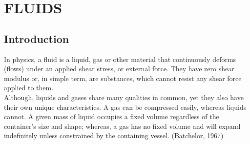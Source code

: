 \documentclass[11pt]{report}
\begin{document}
	\chapter{FLUIDS}
	\section{Introduction}
	In physics, a fluid is a liquid, gas or other material that continuously deforms (flows) under an applied shear stress, or external force. They have zero shear modulus or, in simple term, are substances, which cannot resist any shear force applied to them.\\
	
	Although, liquids and gases share many qualities in common, yet they also have their own unique characteristics. A gas can be compressed easily, whereas liquids cannot. A given mass of liquid occupies a fixed volume regardless of the container's size and shape; whereas, a gas has no fixed volume and will expand indefinitely unless constrained by the containing vessel. (Batchelor, 1967)
	
\end{document}
